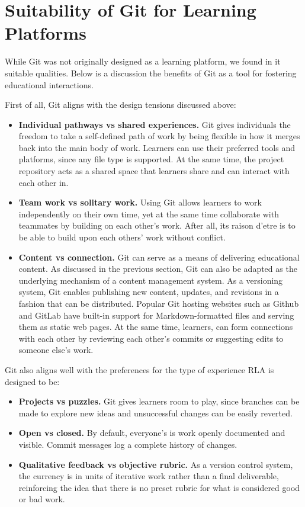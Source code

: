 \documentclass[12pt,twoside]{mitthesis}
\begin{document}
\section{Suitability of Git for Learning Platforms}

While Git was not originally designed as a learning platform, we found in it suitable qualities. Below is a discussion the benefits of Git as a tool for fostering educational interactions.

First of all, Git aligns with the design tensions discussed above: 
\begin{itemize}
\item \textbf{Individual pathways vs shared experiences.} Git gives individuals the freedom to take a self-defined path of work by being flexible in how it merges back into the main body of work. Learners can use their preferred tools and platforms, since any file type is supported. At the same time, the project repository acts as a shared space that learners share and can interact with each other in.
\item \textbf{Team work vs solitary work.} Using Git allows learners to work independently on their own time, yet at the same time collaborate with teammates by building on each other's work. After all, its raison d'etre is to be able to build upon each others' work without conflict.
\item \textbf{Content vs connection.} Git can serve as a means of delivering educational content. As discussed in the previous section, Git can also be adapted as the underlying mechanism of a content management system. As a versioning system, Git enables publishing new content, updates, and revisions in a fashion that can be distributed. Popular Git hosting websites such as Github and GitLab have built-in support for Markdown-formatted files and serving them as static web pages. At the same time, learners, can form connections with each other by reviewing each other's commits or suggesting edits to someone else's work. 
\end{itemize}

Git also aligns well with the preferences for the type of experience RLA is designed to be:
\begin{itemize}
\item \textbf{Projects vs puzzles.} Git gives learners room to play, since branches can be made to explore new ideas and unsuccessful changes can be easily reverted.  
\item \textbf{Open vs closed.} By default, everyone's is work openly documented and visible. Commit messages log a complete history of changes.
\item \textbf{Qualitative feedback vs objective rubric.} As a version control system, the currency is in units of iterative work rather than a final deliverable, reinforcing the idea that there is no preset rubric for what is considered good or bad work.
\end{itemize}
\end{document}
